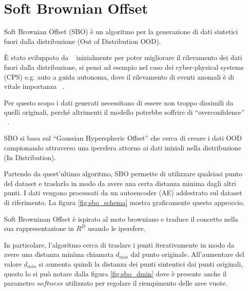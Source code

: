 \chapter{Soft Brownian Offset}

Soft Brownian Offset (SBO) è un algoritmo per la generazione di dati sintetici fuori dalla distribuzione (Out of Distribution OOD). 

È stato sviluppato da ~\cite{sbo} inizialmente per poter migliorare il rilevamento dei dati fuori dalla distribuzione, si pensi ad esempio nel caso dei cyber-physical systems (CPS) e.g. auto a guida autonoma, dove il rilevamento di eventi anomali è di vitale importanza ~\cite{yuhasEmbeddedOutofdistributionDetection2021}.

Per questo scopo i dati generati necessitano di essere non troppo dissimili da quelli originali, perché altrimenti il modello potrebbe soffrire di ``overconfidence'' ~\cite{amodeiConcreteProblemsAI2016}.

SBO si basa sul ``Gaussian Hyperspheric Offset'' che cerca di creare i dati OOD campionando attraverso una ipersfera attorno ai dati iniziali nella distribuzione (In Distribution).

Partendo da quest'ultimo algoritmo, SBO permette di utilizzare qualsiasi punto del dataset e traslarlo in modo da avere una certa distanza minima dagli altri punti. I dati vengono processati da un autoencoder (AE) addestrato sul dataset di riferimento. La figura \ref{fig:sbo_schema} mostra graficamente questo approccio. 

Soft Browninan Offset è ispirato al moto browniano e traduce il concetto nella sua rappresentazione in $R^D$ usando le ipersfere.

In particolare, l'algoritmo cerca di traslare i punti iterativamente in modo da avere una distanza minima chiamata $d_{min}$ dal punto originale. All'aumentare del valore $d_{min}$ si aumenta quindi la distanza dei punti sintentici dai punti originali, questo lo si può notare dalla figura \ref{fig:sbo_dmin} dove è presente anche il parametro $softness$ utilizzato per regolare il riempimento delle aree vuote.


